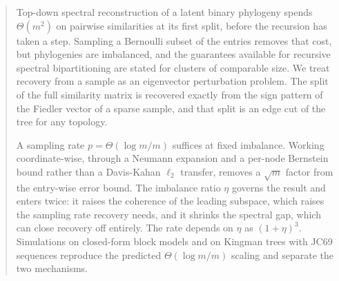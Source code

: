\begin{abstract}
Top-down spectral reconstruction of a latent binary phylogeny spends $\Theta(m^2)$ on pairwise similarities at its first split, before the recursion has taken a step. Sampling a Bernoulli subset of the entries removes that cost, but phylogenies are imbalanced, and the guarantees available for recursive spectral bipartitioning are stated for clusters of comparable size.
We treat recovery from a sample as an eigenvector perturbation problem. The split of the full similarity matrix is recovered exactly from the sign pattern of the Fiedler vector of a sparse sample, and that split is an edge cut of the tree for any topology.

A sampling rate $p=\Theta(\log m/m)$ suffices at fixed imbalance. Working coordinate-wise, through a Neumann expansion and a per-node Bernstein bound rather than a Davis-Kahan $\ell_2$ transfer, removes a $\sqrt m$ factor from the entry-wise error bound.
The imbalance ratio $\eta$ governs the result and enters twice: it raises the coherence of the leading subspace, which raises the sampling rate recovery needs, and it shrinks the spectral gap, which can close recovery off entirely. The rate depends on $\eta$ as $(1+\eta)^3$.
Simulations on closed-form block models and on Kingman trees with JC69 sequences reproduce the predicted $\Theta(\log m/m)$ scaling and separate the two mechanisms.
\end{abstract}
